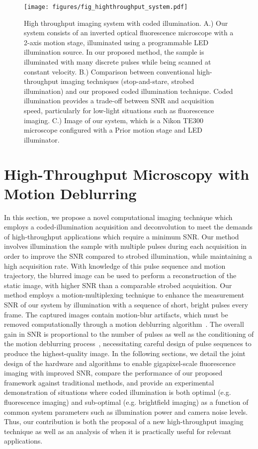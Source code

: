 \begin{figure}
  \centering
    \texttt{[image: figures/fig\_highthroughput\_system.pdf]}
  \caption{\label{fig:system}High throughput imaging system with coded illumination. A.) Our system consists of an inverted optical fluorescence microscope with a 2-axis motion stage, illuminated using a programmable LED illumination source. In our proposed method, the sample is illuminated with many discrete pulses while being scanned at constant velocity. B.) Comparison between conventional high-throughput imaging techniques (stop-and-stare, strobed illumination) and our proposed coded illumination technique. Coded illumination provides a trade-off between SNR and acquisition speed, particularly for low-light situations such as fluorescence imaging. C.) Image of our system, which is a Nikon TE300 microscope configured with a Prior motion stage and LED illuminator.}

\end{figure}

\section{High-Throughput Microscopy with Motion Deblurring}
In this section, we propose a novel computational imaging technique which employs a coded-illumination acquisition and deconvolution to meet the demands of high-throughput applications which require a minimum SNR. Our method involves illumination the sample with multiple pulses during each acquisition in order to improve the SNR compared to strobed illumination, while maintaining a high acquisition rate. With knowledge of this pulse sequence and motion trajectory, the blurred image can be used to perform a reconstruction of the static image, with higher SNR than a comparable strobed acquisition. Our method employs a motion-multiplexing technique to enhance the measurement SNR of our system by illumination with a sequence of short, bright pulses every frame. The captured images contain motion-blur artifacts, which must be removed computationally through a motion deblurring algorithm~\cite{raskar2006coded}. The overall gain in SNR is proportional to the number of pulses as well as the conditioning of the motion deblurring process~\cite{agrawal2009optimal}, necessitating careful design of pulse sequences to produce the highest-quality image. In the following sections, we detail the joint design of the hardware and algorithms to enable gigapixel-scale fluorescence imaging with improved SNR,
compare the performance of our proposed framework against traditional methods, and provide an experimental demonstration of situations where coded illumination is both optimal (e.g. fluorescence imaging) and sub-optimal (e.g. brightfield imaging) as a function of common system parameters such as illumination power and camera noise levels. Thus, our contribution is both the proposal of a new high-throughput imaging technique as well as an analysis of when it is practically useful for relevant applications.


